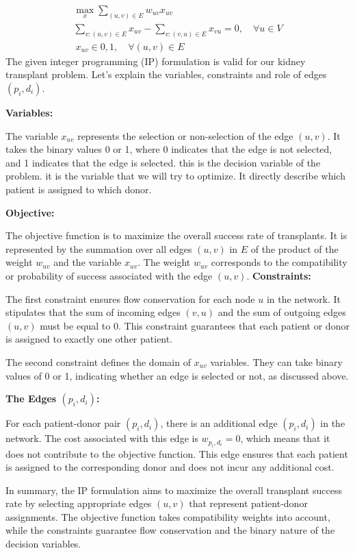 \documentclass{ULBreport}
\begin{document}
\begin{align*}
\max_{x} \sum_{(u, v) \in E} w_{uv} x_{uv}\\ \sum_{v:(u, v) \in E} x_{uv} - \sum_{v:(v, u) \in E} x_{vu} = 0, \quad \forall u \in V \\\
x_{uv} \in {0,1}, \quad \forall (u, v) \in E
\end{align*}
The given integer programming (IP) formulation is valid for our kidney transplant problem. Let's explain the variables, constraints and role of edges $(p_i, d_i)$.

\textbf{Variables:}

The variable $x_{uv}$ represents the selection or non-selection of the edge $(u, v)$. It takes the binary values 0 or 1, where 0 indicates that the edge is not selected, and 1 indicates that the edge is selected. this is the decision variable of the problem. it is the variable that we will try to optimize. It directly describe which patient is assigned to which donor.

\textbf{Objective:}

The objective function is to maximize the overall success rate of transplants. It is represented by the summation over all edges $(u, v)$ in $E$ of the product of the weight $w_{uv}$ and the variable $x_{uv}$. The weight $w_{uv}$ corresponds to the compatibility or probability of success associated with the edge $(u, v)$.
\newpage
\textbf{Constraints:}

The first constraint ensures flow conservation for each node $u$ in the network. It stipulates that the sum of incoming edges $(v, u)$ and the sum of outgoing edges $(u, v)$ must be equal to 0. This constraint guarantees that each patient or donor is assigned to exactly one other patient.

The second constraint defines the domain of $x_{uv}$ variables. They can take binary values of 0 or 1, indicating whether an edge is selected or not, as discussed above.

\textbf{The Edges $(p_i, d_i)$:}

For each patient-donor pair $(p_i, d_i)$, there is an additional edge $(p_i, d_i)$ in the network. The cost associated with this edge is $w_{p_i, d_i} = 0$, which means that it does not contribute to the objective function. This edge ensures that each patient is assigned to the corresponding donor and does not incur any additional cost.

In summary, the IP formulation aims to maximize the overall transplant success rate by selecting appropriate edges $(u, v)$ that represent patient-donor assignments. The objective function takes compatibility weights into account, while the constraints guarantee flow conservation and the binary nature of the decision variables.
\end{document}
